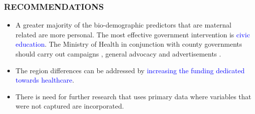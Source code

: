 	\begin{frame}
		\frametitle{RECOMMENDATIONS}
		\begin{itemize}
			\item A greater majority of the bio-demographic predictors that are maternal related are more personal. The most effective government intervention is \textcolor {blue}{civic education}. The Ministry of Health in conjunction with county governments should carry out campaigns , general advocacy and advertisements . 
			\item The region differences can be addressed by \textcolor {blue} {increasing the funding dedicated towards healthcare}. 
			\item There is need for further research that uses primary data where variables that were not captured are incorporated. 
		\end{itemize}
	\end{frame}
